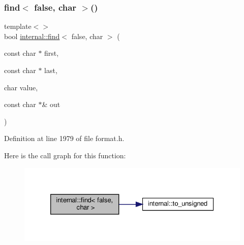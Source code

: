 \subsubsection{\texorpdfstring{find$<$ false, char $>$()}{find< false, char >()}}
{\footnotesize\ttfamily template$<$$>$ \\
bool \hyperlink{namespaceinternal_a1fb268779155d9e5cb2ee01298cf5541}{internal\+::find}$<$ false, char $>$ (\begin{DoxyParamCaption}\item[{const char $\ast$}]{first,  }\item[{const char $\ast$}]{last,  }\item[{char}]{value,  }\item[{const char $\ast$\&}]{out }\end{DoxyParamCaption})\hspace{0.3cm}{\ttfamily [inline]}}



Definition at line 1979 of file format.\+h.

Here is the call graph for this function\+:
\nopagebreak
\begin{figure}[H]
\begin{center}
\leavevmode
\includegraphics[width=326pt]{namespaceinternal_a3bd0e0a06013bfea262462a5b187ce27_cgraph}
\end{center}
\end{figure}
\mbox{\label{namespaceinternal_abc2b5d27eb4b4952f43ef2c96fa08146}} 
